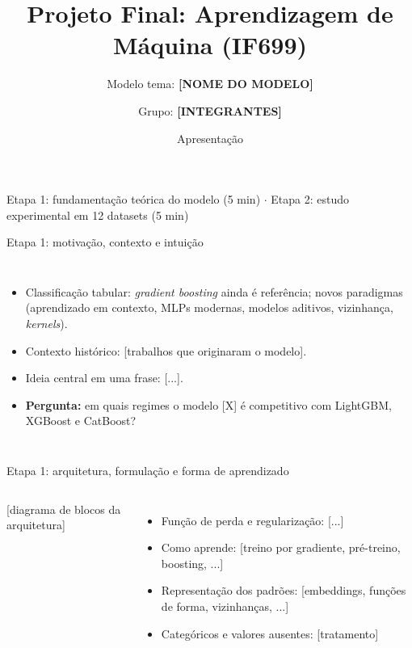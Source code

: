 \documentclass[aspectratio=169,11pt]{beamer}
\title{Projeto Final: Aprendizagem de Máquina (IF699)}
\subtitle{Modelo tema: \textbf{[NOME DO MODELO]}}
\author{Grupo: \textbf{[INTEGRANTES]}}
\institute[CIn/UFPE]{Graduação, CIn/UFPE, 2026.2}
\date{Apresentação}
\begin{document}
\begin{frame}
    \titlepage
    \vspace{-1.2em}
    \centering\footnotesize
    Etapa 1: fundamentação teórica do modelo (5 min) \quad $\cdot$ \quad
    Etapa 2: estudo experimental em 12 datasets (5 min)
\end{frame}


\begin{frame}{Etapa 1: motivação, contexto e intuição}
    \begin{columns}[T,onlytextwidth]
        \begin{itemize}
            \item Classificação tabular: \textit{gradient boosting} ainda é referência; novos paradigmas (aprendizado em contexto, MLPs modernas, modelos aditivos, vizinhança, \textit{kernels}).
            \item Contexto histórico: [trabalhos que originaram o modelo].
            \item Ideia central em uma frase: [...].
            \item \textbf{Pergunta:} em quais regimes o modelo [X] é competitivo com LightGBM, XGBoost e CatBoost?
        \end{itemize}
    \end{columns}
\end{frame}

\begin{frame}{Etapa 1: arquitetura, formulação e forma de aprendizado}
    \begin{columns}[T,onlytextwidth]
        \centering
        [diagrama de blocos da arquitetura]
        \footnotesize
        \begin{itemize}
            \item Função de perda e regularização: [...]
            \item Como aprende: [treino por gradiente, pré-treino, boosting, ...]
            \item Representação dos padrões: [embeddings, funções de forma, vizinhanças, ...]
            \item Categóricos e valores ausentes: [tratamento]
        \end{itemize}
    \end{columns}
\end{frame}
\end{document}
